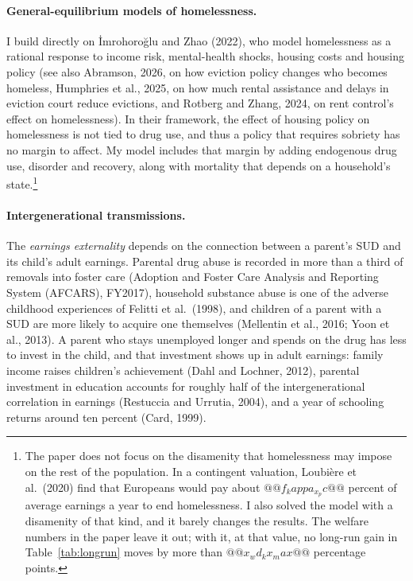 \documentclass[10pt]{article}
\begin{document}
\paragraph{General-equilibrium models of homelessness.} I build directly on
\.{I}mrohoro\u{g}lu and Zhao (2022), who model homelessness as a rational
response to income risk, mental-health shocks, housing costs and housing policy (see also Abramson, 2026, on how eviction policy changes who becomes homeless, Humphries et al., 2025, on how much
rental assistance and delays in eviction court reduce evictions, and Rotberg and Zhang, 2024, on rent control's effect on homelessness).
  In their framework, the effect of housing policy on homelessness is not tied to drug use, and thus a policy that requires sobriety has no margin to affect. My model includes that margin by adding endogenous drug use, disorder and recovery, along with mortality that depends on a household's state.\footnote{\label{fn:kappax}The paper does not focus on the disamenity that homelessness may impose on the rest of the population. In a contingent valuation, Loubi\`ere et al.\ (2020) find that Europeans would pay about $@@f_kappa_x_pc@@$ percent of average earnings a year to end homelessness. I also solved the model with a disamenity of that kind, and it barely changes the results. The welfare numbers in the paper leave it out; with it, at that value, no long-run gain in Table~\ref{tab:longrun} moves by more than $@@x_wd_kx_max@@$ percentage points.}

\paragraph{Intergenerational transmissions.}  The \emph{earnings externality} depends on the connection between a parent's SUD and its child's adult earnings. Parental drug abuse is recorded in more than a third of removals into foster care (Adoption and Foster Care Analysis and Reporting System (AFCARS), FY2017), household substance abuse is one of the adverse childhood experiences of Felitti et al.\ (1998), and children of a parent with a SUD are more likely to acquire one themselves (Mellentin et al., 2016; Yoon et al., 2013). A parent who stays unemployed longer and spends on the drug has less to invest in the child, and that investment shows up in adult earnings: family income raises children's achievement (Dahl and Lochner, 2012), parental investment in education accounts for roughly half of the intergenerational correlation in earnings (Restuccia and Urrutia, 2004), and a year of schooling returns around ten percent (Card, 1999).
\end{document}
